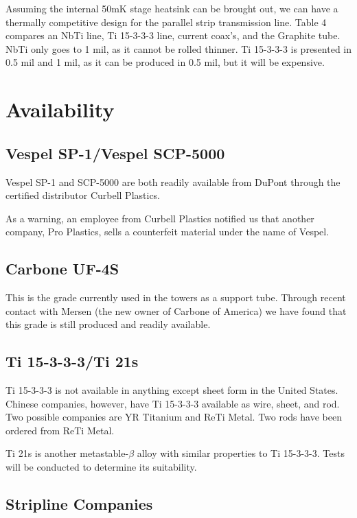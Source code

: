 \documentclass{report}
\begin{document}
\bigskip
Assuming the internal 50mK stage heatsink can be brought out, we can have  a thermally competitive design for the parallel strip transmission line. Table 4 compares an NbTi line, Ti 15-3-3-3 line, current coax's, and the Graphite tube. NbTi only goes to 1 mil, as it cannot be rolled thinner. Ti 15-3-3-3 is presented in 0.5 mil and 1 mil, as it can be produced in 0.5 mil, but it will be expensive.

\section{Availability}
\subsection{Vespel SP-1/Vespel SCP-5000}

Vespel SP-1 and SCP-5000 are both readily available from DuPont through the certified distributor Curbell Plastics.

As a warning, an employee from Curbell Plastics notified us that another company, Pro Plastics, sells a counterfeit material under the name of Vespel.

\subsection{Carbone UF-4S}

This is the grade currently used in the towers as a support tube. Through recent contact with Mersen (the new owner of Carbone of America) we have found that this grade is still produced and readily available.

\subsection{Ti 15-3-3-3/Ti 21s}

Ti 15-3-3-3 is not available in anything except sheet form in the United States. Chinese companies, however, have Ti 15-3-3-3 available as wire, sheet, and rod. Two possible
companies are YR Titanium and ReTi Metal. Two rods have been ordered from ReTi Metal.

Ti 21s is another metastable-$\beta$ alloy with similar properties to Ti 15-3-3-3. Tests will be conducted to determine its suitability.

\subsection{Stripline Companies}
\end{document}

